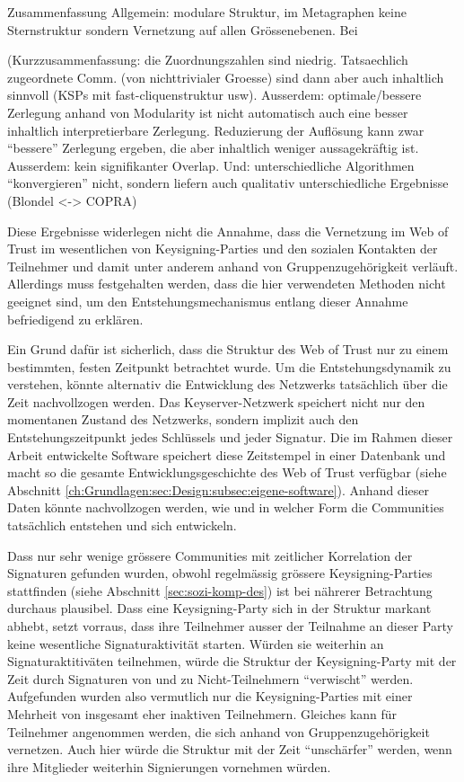 Zusammenfassung Allgemein: modulare Struktur, im Metagraphen keine
Sternstruktur sondern Vernetzung auf allen Gr\"ossenebenen. Bei 

(Kurzzusammenfassung: die Zuordnungszahlen sind niedrig. Tatsaechlich
zugeordnete Comm. (von nichttrivialer Groesse) sind dann aber auch
inhaltlich sinnvoll (KSPs mit fast-cliquenstruktur usw). Ausserdem:
optimale/bessere Zerlegung anhand von Modularity ist nicht automatisch
auch eine besser inhaltlich interpretierbare Zerlegung. Reduzierung
der Aufl\"osung kann zwar ``bessere'' Zerlegung ergeben, die aber
inhaltlich weniger aussagekr\"aftig ist. Ausserdem: kein signifikanter
Overlap. Und: unterschiedliche Algorithmen ``konvergieren'' nicht,
sondern liefern auch qualitativ unterschiedliche Ergebnisse (Blondel
<-> COPRA)

Diese Ergebnisse widerlegen nicht die Annahme, dass die
Vernetzung im Web of Trust im wesentlichen von Keysigning-Parties und
den sozialen Kontakten der Teilnehmer und damit unter anderem anhand
von Gruppenzugeh\"origkeit verl\"auft. Allerdings muss festgehalten
werden, dass die hier verwendeten Methoden nicht geeignet sind, um den
Entstehungsmechanismus entlang dieser Annahme befriedigend zu
erkl\"aren. 

Ein Grund daf\"ur ist sicherlich, dass die Struktur des Web of Trust
nur zu einem bestimmten, festen Zeitpunkt betrachtet wurde. Um die
Entstehungsdynamik zu verstehen, k\"onnte alternativ die Entwicklung
des Netzwerks tats\"achlich \"uber die Zeit nachvollzogen werden. Das
Keyserver-Netzwerk speichert nicht nur den momentanen Zustand des
Netzwerks, sondern implizit auch den Entstehungszeitpunkt jedes
Schl\"ussels und jeder Signatur. Die im Rahmen dieser Arbeit
entwickelte Software speichert diese Zeitstempel in einer Datenbank
und macht so die gesamte Entwicklungsgeschichte des Web of Trust
verf\"ugbar (siehe Abschnitt
\ref{ch:Grundlagen:sec:Design:subsec:eigene-software}). Anhand dieser
Daten k\"onnte nachvollzogen werden, wie und in welcher Form die
Communities tats\"achlich entstehen und sich entwickeln.

Dass nur sehr wenige gr\"ossere Communities mit zeitlicher Korrelation
der Signaturen gefunden wurden, obwohl regelm\"assig gr\"ossere
Keysigning-Parties stattfinden (siehe Abschnitt
\ref{sec:sozi-komp-des}) ist bei n\"ahrerer Betrachtung durchaus
plausibel. Dass eine Keysigning-Party sich in der Struktur markant
abhebt, setzt vorraus, dass ihre Teilnehmer ausser der Teilnahme an
dieser Party keine wesentliche Signaturaktivit\"at starten. W\"urden
sie weiterhin an Signaturaktitiv\"aten teilnehmen, w\"urde die
Struktur der Keysigning-Party mit der Zeit durch Signaturen von und zu
Nicht-Teilnehmern ``verwischt'' werden. Aufgefunden wurden also
vermutlich nur die Keysigning-Parties mit einer Mehrheit von insgesamt
eher inaktiven Teilnehmern. Gleiches kann f\"ur Teilnehmer angenommen
werden, die sich anhand von Gruppenzugeh\"origkeit vernetzen. Auch
hier w\"urde die Struktur mit der Zeit ``unsch\"arfer'' werden, wenn
ihre Mitglieder weiterhin Signierungen vornehmen w\"urden.

